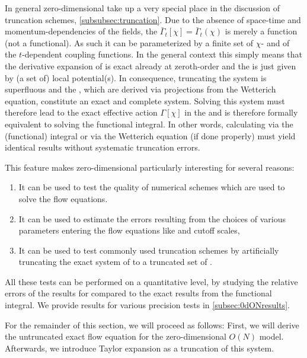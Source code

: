 In general zero-dimensional \qfts{} take up a very special place in the discussion of truncation schemes, \cf{} \cref{subsubsec:truncation}.
Due to the absence of space-time and momentum-dependencies of the fields, the \eaa{} $\bar{\Gamma}_t [ \chi ] = \bar{\Gamma}_t ( \chi )$ is merely a function (not a functional).
As such it can be parameterized by a finite set of $\chi$- and of the $t$-dependent coupling functions.
In the general \frg{} context this simply means that the derivative expansion of \deRef{} is exact already at zeroth-order and the \eaa{} is just given by (a set of) local potential(s).
In consequence, truncating the system is superfluous and the \pdes{}, which are derived via projections from the Wetterich equation, constitute an exact and complete system.
Solving this system must therefore lead to the exact effective action $\Gamma [ \chi ]$ in the \ir{} and is therefore formally equivalent to solving the functional integral.
In other words, calculating \nptFunctions{} via the (functional) integral or via the Wetterich equation (if done properly) must yield identical results without systematic truncation errors.

This feature makes zero-dimensional \qft{} particularly interesting for several reasons:
	\begin{enumerate}
		\item	It can be used to test the quality of numerical schemes which are used to solve the flow equations.
		
		\item	It can be used to estimate the errors resulting from the choices of various parameters entering the \frg{} flow equations like \uv{} and \ir{} cutoff scales, \etc{}
		
		\item	It can be used to test commonly used truncation schemes by artificially truncating the exact system of \pdes{} to a truncated set of \odes{}.
	\end{enumerate}
All these tests can be performed on a quantitative level, by studying the relative errors of the \frg{} results for \nptFunctions{} compared to the exact results from the functional integral.
We provide results for various precision tests in \cref{subsec:0dONresults}.

For the remainder of this section, we will proceed as follows: First, we will derive the untruncated exact \frg{} flow equation for the zero-dimensional $O(N)$ model.
Afterwards, we introduce \frg{} Taylor expansion as a truncation of this system.

